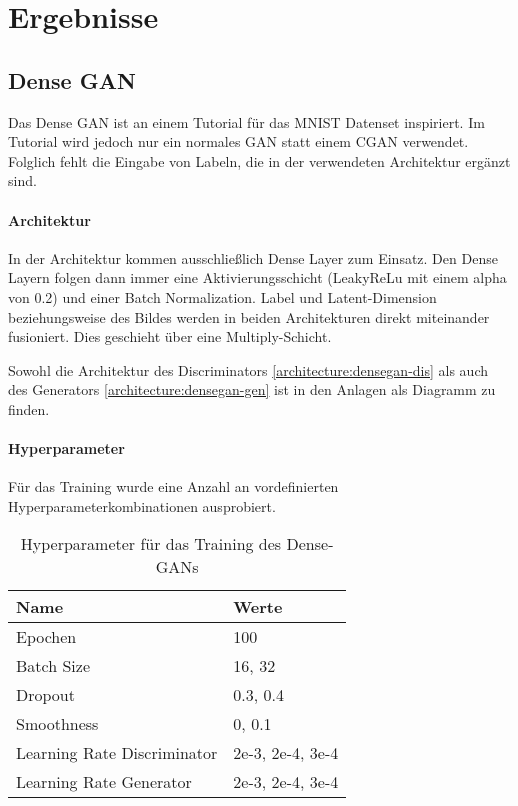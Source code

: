 
\chapter{Ergebnisse}

\section{Dense GAN}
\label{section:dense-gan}
Das Dense GAN ist an einem Tutorial für das MNIST Datenset inspiriert.
Im Tutorial wird jedoch nur ein normales GAN statt einem CGAN verwendet.
Folglich fehlt die Eingabe von Labeln, die in der verwendeten Architektur ergänzt sind.

\subsubsection{Architektur}
In der Architektur kommen ausschließlich Dense Layer zum Einsatz.
Den Dense Layern folgen dann immer eine Aktivierungsschicht (LeakyReLu mit einem alpha von 0.2) und einer Batch Normalization.
Label und Latent-Dimension beziehungsweise des Bildes werden in beiden Architekturen direkt miteinander fusioniert.
Dies geschieht über eine Multiply-Schicht.

Sowohl die Architektur des Discriminators \cref{architecture:densegan-dis} als auch des Generators \cref{architecture:densegan-gen} ist in den Anlagen als Diagramm zu finden.

\subsubsection{Hyperparameter}
Für das Training wurde eine Anzahl an vordefinierten Hyperparameterkombinationen ausprobiert.

\begin{table}[H]
	\centering
	\begin{tabular}{l l}
		Name                        & Werte            \\ \hline
		Epochen                     & 100              \\
		Batch Size                  & 16, 32           \\
		Dropout                     & 0.3, 0.4         \\
		Smoothness                  & 0, 0.1           \\
		Learning Rate Discriminator & 2e-3, 2e-4, 3e-4 \\
		Learning Rate Generator     & 2e-3, 2e-4, 3e-4
	\end{tabular}
	\caption{Hyperparameter für das Training des Dense-GANs}
\end{table}

